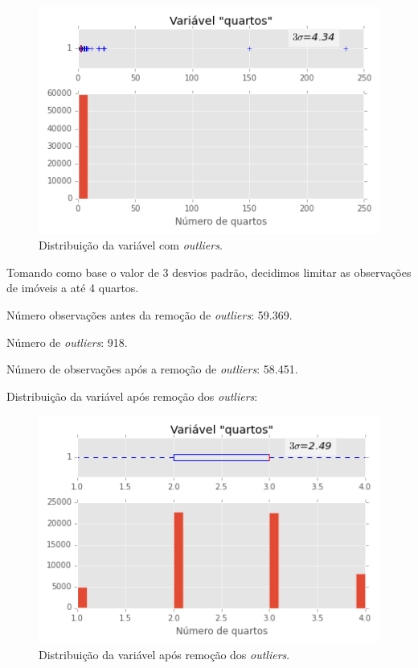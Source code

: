 \begin{figure}[H]
\centering
		\includegraphics[width=0.8\linewidth]{img/var_quartos_boxhist_antes}
\caption{Distribuição da variável  com \textit{outliers}.}
\label{fig:var_quartos_boxhist_antes}
\end{figure}


Tomando como base o valor de 3 desvios padrão, decidimos limitar as observações de imóveis a até 4 quartos. 

Número observações antes da remoção de \textit{outliers}: 59.369. 

Número de \textit{outliers}: 918.

Número de observações após a remoção de \textit{outliers}: 58.451.

Distribuição da variável  após remoção dos \textit{outliers}:

	
\begin{figure}[H]
\centering
\includegraphics[width=0.8\linewidth]{img/var_quartos_boxhist_depois}
\caption{Distribuição da variável  após remoção dos \textit{outliers}.}
\label{fig:var_quartos_boxhist_depois}
\end{figure}



